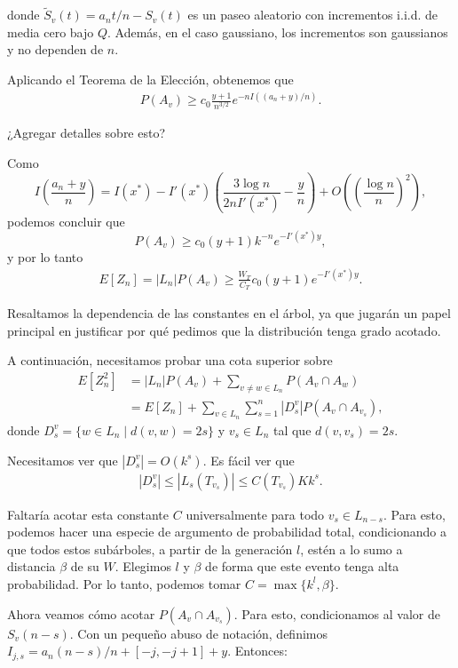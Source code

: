 \documentclass[12pt]{report}
\begin{document}
donde $\tilde{S}_v (t) = a_n t / n - S_v (t)$ es un paseo aleatorio con incrementos i.i.d. de media cero bajo $Q$. 
Además, en el caso gaussiano, los incrementos son gaussianos y no dependen de $n$.

Aplicando el Teorema de la Elección, obtenemos que 
\begin{align}
P(A_v) \geq c_0 \frac{y + 1}{n^{3/2}} e^{-nI((a_n + y)/n)}.
\end{align}

¿Agregar detalles sobre esto?

Como
\[
I\left(\frac{a_n + y}{n}\right) = I(x^*) - I'(x^*)\left( \frac{3 \log n}{2n I'(x^*)} - \frac{y}{n} \right) + O\left(\left(\frac{\log n}{n}\right)^2\right),
\]
podemos concluir que
\[
P(A_v) \geq c_0 (y + 1) k^{-n} e^{-I'(x^*) y},
\]
y por lo tanto
\begin{align}
E[Z_n] = |L_n| P(A_v) \geq \frac{W_T}{C_T} c_0 (y + 1) e^{-I'(x^*) y}.
\end{align}

Resaltamos la dependencia de las constantes en el árbol, ya que jugarán un papel principal en justificar por qué pedimos que la distribución tenga grado acotado.

A continuación, necesitamos probar una cota superior sobre
\begin{align}
E[Z_n^2] &= |L_n| P(A_v) + \sum_{v \neq w \in L_n} P(A_v \cap A_w) \nonumber \\
         &= E[Z_n] + \sum_{v \in L_n} \sum_{s = 1}^{n} |D_s^v| P(A_v \cap A_{v_s}),
\end{align}
donde $D_s^v = \{ w \in L_n \mid d(v,w) = 2s \}$ y $v_s \in L_n$ tal que $d(v, v_s) = 2s$.

Necesitamos ver que $|D_s^v| = O(k^s)$. Es fácil ver que
\begin{align}
|D_s^v| \leq |L_s(T_{v_s})| \leq C(T_{v_s}) K k^s.
\end{align}

Faltaría acotar esta constante $C$ universalmente para todo $v_s \in L_{n-s}$. Para esto, podemos hacer una 
especie de argumento de probabilidad total, condicionando a que todos estos subárboles, a partir de la generación $l$, 
estén a lo sumo a distancia $\beta$ de su $W$. Elegimos $l$ y $\beta$ de forma que este evento tenga alta 
probabilidad. Por lo tanto, podemos tomar $C = \max\{k^l, \beta\}$.

\vspace{1em}

Ahora veamos cómo acotar $P(A_v \cap A_{v_s})$. Para esto, condicionamos al valor de $S_v(n - s)$. 
Con un pequeño abuso de notación, definimos $I_{j,s} = a_n (n - s)/n + [-j, -j + 1] + y$. Entonces:
\end{document}
